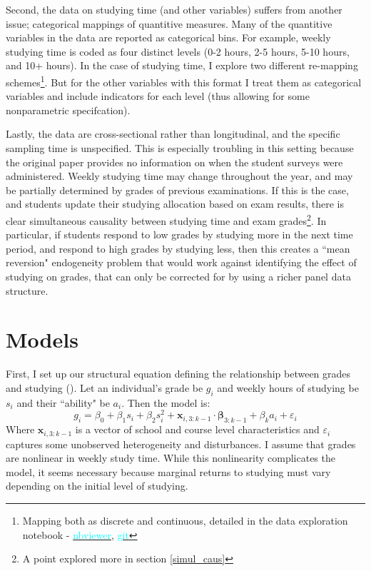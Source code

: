 \documentclass[12pt]{article}
\begin{document}
Second, the data on studying time (and other variables) suffers from another issue; categorical mappings of quantitive measures. Many of the quantitive variables in the data are reported as categorical bins. For example, weekly studying time is coded as four distinct levels (0-2 hours, 2-5 hours, 5-10 hours, and 10+ hours). In the case of studying time, I explore two different re-mapping schemes\footnote{Mapping both as discrete and continuous, detailed in the data exploration notebook - \href{https://nbviewer.jupyter.org/github/nadavtadelis/Reproducible_Metrics/blob/master/data_exploration.ipynb}{\textcolor{cyan}{nbviewer}}, \href{https://github.com/nadavtadelis/Reproducible_Metrics/blob/master/data_exploration.ipynb}{\textcolor{cyan}{git}}}. But for the other variables with this format I treat them as categorical variables and include indicators for each level (thus allowing for some nonparametric specifcation).

Lastly, the data are cross-sectional rather than longitudinal, and the specific sampling time is unspecified. This is especially troubling in this setting because the original paper provides no information on when the student surveys were administered. Weekly studying time may change throughout the year, and may be partially determined by grades of previous examinations. If this is the case, and students update their studying allocation based on exam results, there is clear simultaneous causality between studying time and exam grades\footnote{A point explored more in section \ref{simul_caus}}. In particular, if students respond to low grades by studying more in the next time period, and respond to high grades by studying less, then this creates a ``mean reversion" endogeneity problem that would work against identifying the effect of studying on grades, that can only be corrected for by using a richer panel data structure.


\newpage
\section{Models} \label{models}
First, I set up our structural equation defining the relationship between grades and studying (\cite{CardKrueger}). Let an individual's grade be $g_i$ and weekly hours of studying be $s_i$ and their ``ability" be $a_i$. Then the model is:
$$
g_i = \beta_0 + \beta_1 s_i + \beta_2 s_i^2  + \bm{x}_{i,3:k-1}\cdot\bm{\beta}_{3:k-1} + \beta_k a_i + \varepsilon_i
$$
Where $\bm{x}_{i,3:k-1}$ is a vector of school and course level characteristics and $\varepsilon_i$ captures some unobserved heterogeneity and disturbances. I assume that grades are nonlinear in weekly study time. While this nonlinearity complicates the model, it seems necessary because marginal returns to studying must vary depending on the initial level of studying.
\end{document}
